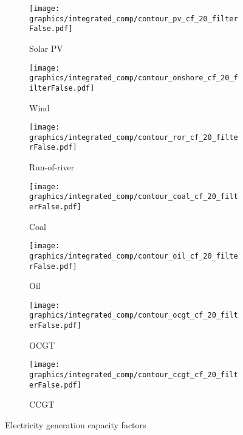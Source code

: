 \begin{figure*}[h] %
    \centering
    \begin{subfigure}[b]{0.45\linewidth}
        \centering
        \texttt{[image: graphics/integrated\_comp/contour\_pv\_cf\_20\_filterFalse.pdf]}
        \caption{Solar PV}
    \end{subfigure}
    \hfill
    \begin{subfigure}[b]{0.45\linewidth}
        \centering
        \texttt{[image: graphics/integrated\_comp/contour\_onshore\_cf\_20\_filterFalse.pdf]}
        \caption{Wind}
    \end{subfigure}
    \hfill
    \begin{subfigure}[b]{0.45\linewidth}
        \centering
        \texttt{[image: graphics/integrated\_comp/contour\_ror\_cf\_20\_filterFalse.pdf]}
        \caption{Run-of-river}
    \end{subfigure}
    \hfill
    \begin{subfigure}[b]{0.45\linewidth}
        \centering
        \texttt{[image: graphics/integrated\_comp/contour\_coal\_cf\_20\_filterFalse.pdf]}
        \caption{Coal}
    \end{subfigure}
    \hfill
    \begin{subfigure}[b]{0.45\linewidth}
        \centering
        \texttt{[image: graphics/integrated\_comp/contour\_oil\_cf\_20\_filterFalse.pdf]}
        \caption{Oil}
    \end{subfigure}
    \hfill
    \begin{subfigure}[b]{0.45\linewidth}
        \centering
        \texttt{[image: graphics/integrated\_comp/contour\_ocgt\_cf\_20\_filterFalse.pdf]}
        \caption{OCGT}
    \end{subfigure}
    \hfill
    \begin{subfigure}[b]{0.45\linewidth}
        \centering
        \texttt{[image: graphics/integrated\_comp/contour\_ccgt\_cf\_20\_filterFalse.pdf]}
        \caption{CCGT}
    \end{subfigure}
    \hfill

    \caption{Electricity generation capacity factors}
    \label{fig:capacities}
\end{figure*}




